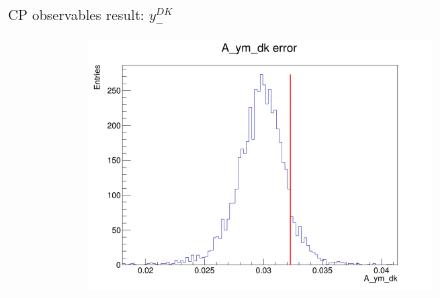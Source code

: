 \documentclass{beamer}
\begin{document}
\begin{frame}{CP observables result: $y_-^{DK}$}
\begin{figure}
\begin{subfigure}{0.42\textwidth}
      \includegraphics[width = 1.0\textwidth]{Plots/A_ym_dk_error_WithDataUncertainty.png}
    \end{subfigure}
  \end{figure}
\end{frame}
\end{document}
